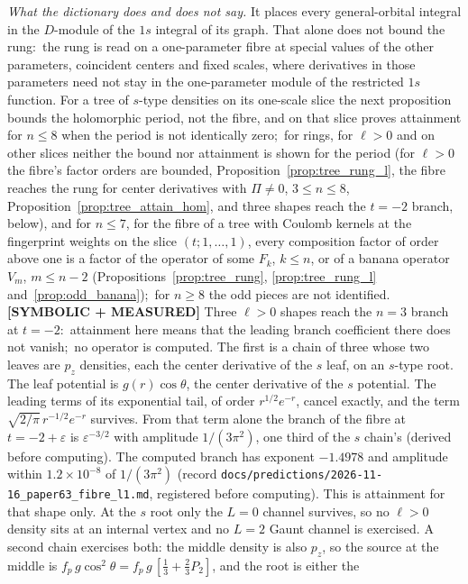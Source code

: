 \documentclass[aps,pra,twocolumn,superscriptaddress,longbibliography]{revtex4-2}
\begin{document}
\emph{What the dictionary does and does not say.}  It places every
general-orbital integral in the $D$-module of the $1s$ integral of its graph.
That alone does not bound the rung:\ the rung is read on a one-parameter fibre
at special values of the other parameters, coincident centers and fixed
scales, where derivatives in those parameters need not stay in the
one-parameter module of the restricted $1s$ function.  For a tree of $s$-type
densities on its one-scale slice the next proposition bounds the holomorphic
period, not the fibre, and on that slice proves attainment for $n\le8$ when
the period is not identically zero;\ for rings, for $\ell>0$ and on other slices
neither the bound nor attainment is shown for the period (for $\ell>0$ the fibre's factor
orders are bounded, Proposition~\ref{prop:tree_rung_l}, the fibre reaches the rung
for center derivatives with $\Pi\neq0$, $3\le n\le8$,
Proposition~\ref{prop:tree_attain_hom}, and
three shapes reach the $t=-2$ branch, below), and for $n\le7$, for the fibre of a tree with Coulomb kernels at the
fingerprint weights on the slice $(t;1,\dots,1)$, every composition factor of
order above one is a factor of the operator of some $F_k$, $k\le n$, or of a banana
operator $V_m$, $m\le n-2$ (Propositions~\ref{prop:tree_rung},
\ref{prop:tree_rung_l} and~\ref{prop:odd_banana});\ for $n\ge8$ the odd pieces are not identified.
\textbf{[SYMBOLIC + MEASURED]} Three $\ell>0$ shapes reach the $n=3$ branch at
$t=-2$:\ attainment here means that the leading branch coefficient there does
not vanish;\ no operator is computed.  The first is a
chain of three whose two leaves are $p_z$ densities, each the center
derivative of the $s$ leaf, on an $s$-type root.  The leaf potential is
$g(r)\cos\theta$, the center derivative of the $s$ potential.  The leading
terms of its exponential tail, of order $r^{1/2}e^{-r}$, cancel exactly, and
the term $\sqrt{2/\pi}\,r^{-1/2}e^{-r}$ survives.  From that term alone the
branch of the fibre at $t=-2+\varepsilon$ is
$\varepsilon^{-3/2}$ with amplitude $1/(3\pi^2)$, one third of the $s$
chain's (derived before computing).  The computed branch has exponent
$-1.4978$ and amplitude within $1.2\times10^{-8}$ of $1/(3\pi^2)$ (record
\texttt{docs/predictions/2026-11-16\_paper63\_fibre\_l1.md}, registered
before computing).  This is attainment for that shape only.  At the $s$ root
only the $L=0$ channel survives, so no $\ell>0$ density sits at an internal
vertex and no $L=2$ Gaunt channel is exercised.  A second chain exercises both:
the middle density is also $p_z$, so the source at the middle is
$f_p\,g\cos^2\theta=f_p\,g\,[\tfrac13+\tfrac23P_2]$, and the root is either the
\end{document}
